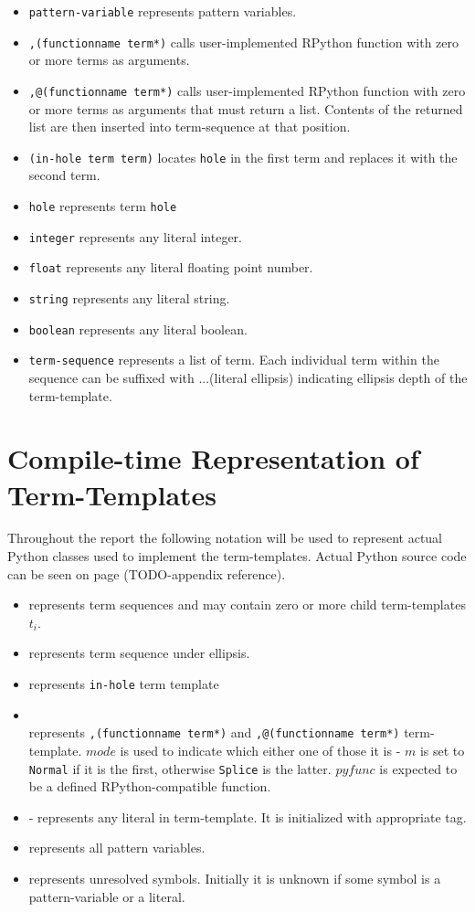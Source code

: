 \begin{itemize}
\item 
\texttt{pattern-variable} represents pattern variables.
\item
\texttt{,(functionname term*)} calls user-implemented RPython function with zero or more terms as arguments.
\item
\texttt{,@(functionname term*)} calls user-implemented RPython function with zero or more terms as arguments that must return a list. Contents of the returned list are then inserted into term-sequence at that position. 
\item
\texttt{(in-hole term term)} locates \lstinline{hole} in the first term and replaces it with the second term.
\item
\texttt{hole} represents term \lstinline{hole}
\item
\texttt{integer} represents any literal integer.
\item
\texttt{float} represents any literal floating point number.
\item
\texttt{string}  represents any literal string.
\item
\texttt{boolean}  represents any literal boolean.
\item
\texttt{term-sequence} represents a list of term.  Each individual term within the sequence can be suffixed with ...(literal ellipsis) indicating ellipsis depth of the term-template.
\end{itemize}

\section{Compile-time Representation of Term-Templates}

Throughout the report the following notation will be used to represent actual Python classes used to implement the term-templates. Actual Python source code can be seen on page (TODO-appendix reference). 


\begin{itemize}
\item \TermSequence \space represents term sequences and may contain zero or more child term-templates $t_i$.
\item \TermRepeat \space represents term sequence under ellipsis.
\item \TermInHole \space represents \texttt{in-hole} term template
\item \PythonCall \\ represents \texttt{,(functionname term*)} and \texttt{,@(functionname term*)} term-template. $mode$ is used to indicate which either one of those it is - $m$ is set to \texttt{Normal} if it is the first, otherwise \texttt{Splice} is the latter. $pyfunc$ is expected to be a defined RPython-compatible function.
\item \TermLiteral - represents any literal in term-template. It is initialized with appropriate tag.
\item \PatternVariable \space represents all pattern variables.
\item \UnresolvedSymbol \space represents unresolved symbols. Initially it is unknown if some symbol is a pattern-variable or a literal.
\end{itemize}

